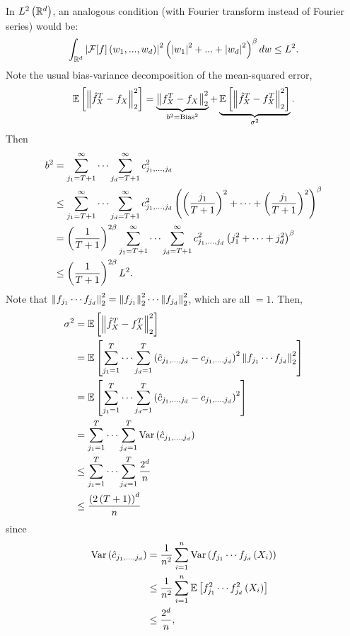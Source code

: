 {In $L^2\left(\mathbb{R}^d\right)$, an analogous condition (with Fourier transform instead of Fourier series) would be:
\begin{equation*}
\int_{\mathbb{R}^d} \left| \mathcal F[f]\left(w_1,...,w_d\right)\right|^2\left(\left| w_1\right|^2+...+\left| w_d\right|^2\right)^\beta dw \leq L^2.
\end{equation*}}
Note the usual bias-variance decomposition of the mean-squared error,
\begin{equation*}
  \mathbb{E}\left[\left\| \hat f_X^T - f_X \right\|^2_2\right] = \underbrace{\left\| f_X^T - f_X  \right\|^2_2}_{b^2=\text{Bias}^2} + \underbrace{\mathbb{E}\left[\left\| \hat{f}_X^T - f_X^T \right\|_2^2\right]}_{\sigma^2}.
\end{equation*}
Then
\begin{equation*}
\begin{split}
  b^2 &= \sum_{j_1 = T+1}^\infty \cdots \sum_{j_d = T+1}^\infty c^2_{j_1,\ldots, j_d} \\
  &\leq \sum_{j_1 = T+1}^\infty \cdots \sum_{j_d = T+1}^\infty c^2_{j_1,\ldots, j_d} \left(\left(\frac{j_1}{T+1}\right)^2 + \cdots + \left(\frac{j_1}{T+1}\right)^2\right)^\beta \\
  &= \left(\frac{1}{T+1}\right)^{2\beta } \sum_{j_1 = T+1}^\infty \cdots \sum_{j_d = T+1}^\infty c^2_{j_1,\ldots, j_d} \left(j_1^2 + \cdots + j_d^2\right)^\beta \\
  &\leq \left(\frac{1}{T+1}\right)^{2\beta} L^2.
\end{split}
\end{equation*}
Note that $\left\| f_{j_1}\cdots f_{j_d} \right\|_2^2 = \left\| f_{j_1} \right\|_2^2 \cdots \left\| f_{j_d} \right\|_2^2$, which are all $=1$. Then,
\begin{equation*}
\begin{split}
  \sigma^2 &= \mathbb{E}\left[ \left\| \hat{f}_X^T - f_X^T \right\|_2^2\right]\\
   &= \mathbb{E}\left[\sum_{j_1=1}^T \cdots \sum_{j_d=1}^T \left(\hat{c}_{j_1,\ldots,j_d} - c_{j_1,\ldots, j_d}\right)^2\left\| f_{j_1}\cdots f_{j_d} \right\|^2_2 \right]\\
   &= \mathbb{E}\left[\sum_{j_1=1}^T \cdots \sum_{j_d=1}^T \left(\hat{c}_{j_1,\ldots,j_d} - c_{j_1,\ldots, j_d}\right)^2\right] \\
  &= \sum_{j_1=1}^T \cdots \sum_{j_d=1}^T \mathrm{Var}\left(\hat c_{j_1,...,j_d}\right)   \\
  &\leq \sum_{j_1=1}^T \cdots \sum_{j_d=1}^T \frac{2^d}{n}\\
  &\leq \frac{\left(2 \left(T+1\right) \right)^d }{n}
\end{split}
\end{equation*}
since
\begin{equation*}
\begin{split}
  \mathrm{Var}\left(\hat c_{j_1,...,j_d}\right) &= \frac{1}{n^2} \sum_{i=1}^n \mathrm{Var} \left(f_{j_1} \cdots f_{j_d} \left(X_i\right)\right) \\
  &\leq \frac{1}{n^2} \sum_{i=1}^n \mathbb{E} \left[f_{j_1}^2 \cdots f_{j_d}^2 \left(X_i\right)\right]\\
  &\leq \frac{2^d}{n},
  \end{split}
\end{equation*}
